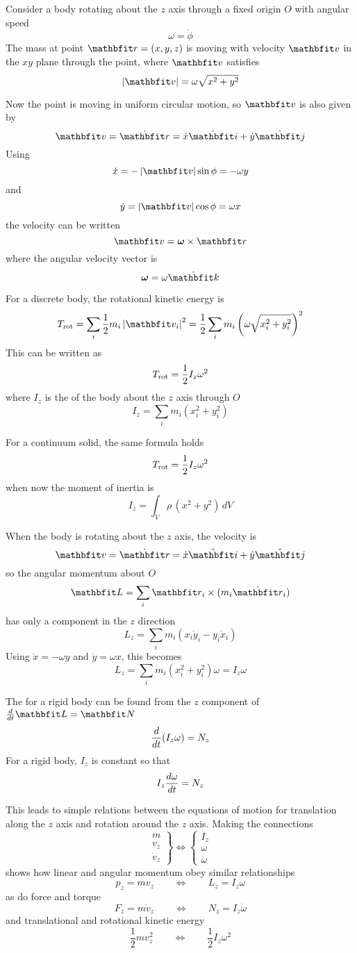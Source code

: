 Consider a body rotating about the $z$ axis through a fixed origin $O$ with
angular speed
$$\omega=\dot{\phi}$$
The mass at point $\vect{r}=(x,y,z)$ is moving with velocity $\vect{v}$ in 
the $xy$ plane through the point, where $\vect{v}$ satisfies
$$\left|\vect{v}\right|=\omega\sqrt{x^2+y^2}$$

Now the point is moving in uniform circular motion, so $\vect{v}$ is also 
given by
$$\vect{v}=\dot{\vect{r}}=\dot{x}\ivect+\dot{y}\jvect$$
Using
$$\dot{x}=-\left|\vect{v}\right|\sin\phi=-\omega y$$
and
$$\dot{y}=\left|\vect{v}\right|\cos\phi=\omega x$$
the velocity can be written
$$\vect{v}=\boldsymbol{\omega}\times\vect{r}$$
where the angular velocity vector is
$$\boldsymbol{\omega}=\omega\kvect$$

For a discrete body, the rotational kinetic energy is
$$T_{\rm rot}=\sum_i\frac{1}{2}m_i\left|\vect{v}_i\right|^2
=\frac{1}{2}\sum_im_i\left(\omega\sqrt{x_i^2+y_i^2}\right)^2$$
This can be written as
$$T_{\rm rot}=\frac{1}{2}I_z\omega^2$$
where $I_z$ is the  of the body about the $z$ axis
through $O$
$$I_z=\sum_i m_i\left(x_i^2+y_i^2\right)$$

For a continuum solid, the same formula holds
$$T_{\rm rot}=\frac{1}{2}I_z\omega^2$$
when now the moment of inertia is
$$I_z=\int_V \rho\,(x^2+y^2) \,dV$$

When the body is rotating about the $z$ axis, the velocity is
$$\vect{v}=\dot{\vect{r}}=\dot{x}\ivect+\dot{y}\jvect$$
so the angular momentum about $O$
$$\vect{L}=\sum_i\vect{r}_i\times(m_i\dot{\vect{r}}_i)$$
has only a component in the $z$ direction
$$L_z=\sum_i m_i(x_i\dot{y}_i-y_i\dot{x}_i)$$
Using $\dot{x}=-\omega y$ and $\dot{y}=\omega x$, this becomes
$$L_z=\sum_i m_i(x_i^2+y_i^2)\omega=I_z\omega$$

The  for a rigid body can be found from the
$z$ component of $\dbd{t}\vect{L}=\vect{N}$
$$\frac{d}{d{t}}(I_z\omega)=N_z$$
For a rigid body, $I_z$ is constant so that
$$I_z\frac{d\omega}{dt}=N_z$$

This leads to simple relations between the equations of motion for
translation along the $z$ axis and rotation around the $z$ axis.  Making the
connections
$$\left.\begin{array}{c}m \\ v_z \\ \dot{v}_z \end{array}\right\}\iff
\left\{\begin{array}{c}I_z \\ \omega \\ \dot{\omega} \end{array}\right.$$
shows how linear and angular momentum obey similar relationships
$$p_z=mv_z\qquad\iff\qquad L_z=I_z\omega$$
as do force and torque
$$F_z=m\dot{v}_z\qquad\iff\qquad N_z=I_z\dot{\omega}$$
and translational and rotational kinetic energy
$$\frac{1}{2}mv_z^2\qquad\iff\qquad\frac{1}{2}I_z\omega^2$$
 

